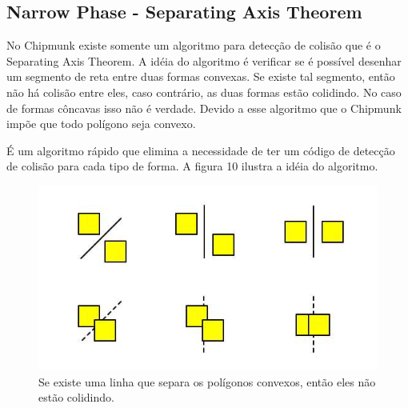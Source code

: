 \subsection{Narrow Phase - Separating Axis Theorem}

No Chipmunk existe somente um algoritmo para detecção de colisão que é o Separating Axis Theorem. A idéia do algoritmo é verificar se é possível desenhar um segmento 
de reta entre duas formas convexas. Se existe tal segmento, então não há colisão entre eles, caso contrário, as duas formas estão colidindo. No caso de formas
côncavas isso não é verdade. Devido a esse algoritmo que o Chipmunk impõe que todo polígono seja convexo.

É um algoritmo rápido que elimina a necessidade de ter um código de detecção de colisão para cada tipo de forma. A figura 10 ilustra a idéia do algoritmo.

\begin{figure}[!htbp]
    \includegraphics[scale=0.5]{SAT.jpg}
  \caption{Se existe uma linha que separa os polígonos convexos, então eles não estão colidindo.}
\end{figure}
